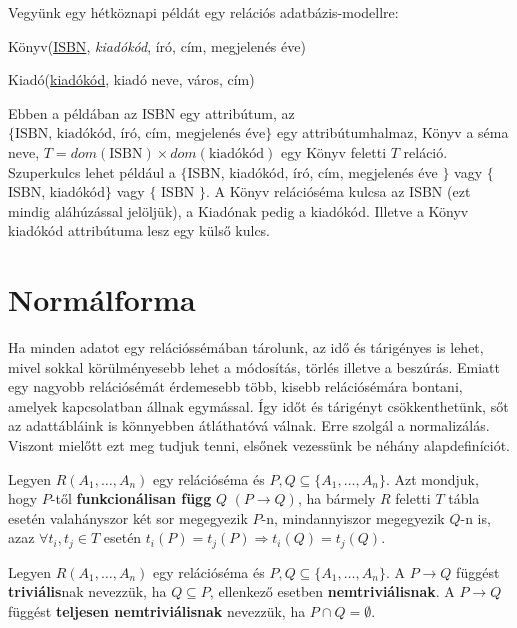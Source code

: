 \begin{pld}
Vegyünk egy hétköznapi példát egy relációs adatbázis-modellre:\par

    Könyv(\underline{ISBN}, \textit{kiadókód}, író, cím, megjelenés éve)\par
    Kiadó(\underline{kiadókód}, kiadó neve, város, cím)\par

Ebben a példában az ISBN egy attribútum, az $\{\text{ISBN, kiadókód, író, cím, megjelenés éve} \}$ egy attribútumhalmaz, Könyv a séma neve, $T = dom(\text{ISBN}) \times dom(\text{kiadókód})$ egy Könyv feletti $T$ reláció.
Szuperkulcs lehet például a $\{$ISBN, kiadókód, író, cím, megjelenés éve $\}$ vagy $\{$ISBN, kiadókód$\}$ vagy $\{$ ISBN $\}$. A Könyv relációséma kulcsa az ISBN (ezt mindig aláhúzással jelöljük), a Kiadónak pedig a kiadókód. Illetve a Könyv kiadókód attribútuma lesz egy külső kulcs.
\end{pld}

\section{Normálforma}

Ha minden adatot egy relációssémában tárolunk, az idő és tárigényes is lehet, mivel sokkal körülményesebb lehet a módosítás, törlés illetve a beszúrás. Emiatt egy nagyobb relációsémát érdemesebb több, kisebb relációsémára bontani, amelyek kapcsolatban állnak egymással. Így időt és tárigényt csökkenthetünk, sőt az adattábláink is könnyebben átláthatóvá válnak. Erre szolgál a normalizálás. Viszont mielőtt ezt meg tudjuk tenni, elsőnek vezessünk be néhány alapdefiníciót.

\begin{defi} 
Legyen $R(A_1,\ldots,A_n)$ egy relációséma és $P,Q \subseteq \{A_1,\ldots,A_n\}$. Azt mondjuk, hogy $P$-től \textbf{funkcionálisan függ} $Q$ $(P \rightarrow Q)$, ha bármely $R$ feletti $T$ tábla esetén valahányszor két sor megegyezik $P$-n, mindannyiszor megegyezik $Q$-n is, azaz 
$\forall t_i, t_j \in T$ esetén $ t_i(P) = t_j(P) \Rightarrow t_i(Q) = t_j(Q)$. 
\end{defi}

\begin{defi}
Legyen $R(A_1,\ldots,A_n)$ egy relációséma és $P,Q \subseteq \{A_1,\ldots,A_n\}$. A $P \longrightarrow Q$ függést \textbf{triviális}nak nevezzük, ha $Q \subseteq P$, ellenkező esetben \textbf{nemtriviálisnak}. A $P \longrightarrow Q$ függést \textbf{teljesen nemtriviálisnak} nevezzük, ha $P \cap Q = \emptyset$.
\end{defi}

